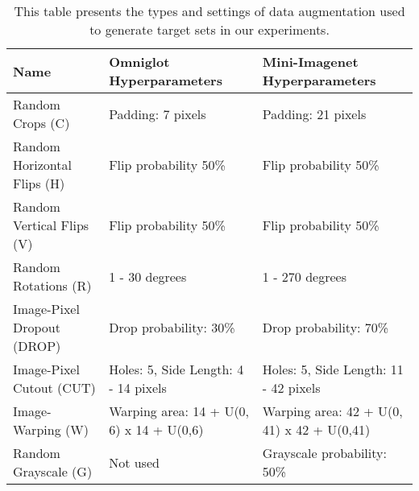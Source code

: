 \documentclass{article}
\begin{document}
\begin{table*}[!htp]
\begin{tabular}{lll}
\hline
\multicolumn{1}{|l|}{Name}                        & \multicolumn{1}{l|}{Omniglot Hyperparameters}                 & \multicolumn{1}{l|}{Mini-Imagenet Hyperparameters}                   \\ \hline
\multicolumn{1}{|l|}{Random Crops (C)}            & \multicolumn{1}{l|}{Padding: 7 pixels}                        & \multicolumn{1}{l|}{Padding: 21 pixels}                         \\ \hline
\multicolumn{1}{|l|}{Random Horizontal Flips (H)} & \multicolumn{1}{l|}{Flip probability 50\%}                     & \multicolumn{1}{l|}{Flip probability 50\%}                       \\ \hline
\multicolumn{1}{|l|}{Random Vertical Flips (V)}   & \multicolumn{1}{l|}{Flip probability 50\%}                     & \multicolumn{1}{l|}{Flip probability 50\%}                       \\ \hline
\multicolumn{1}{|l|}{Random Rotations (R)}        & \multicolumn{1}{l|}{1 - 30 degrees}                           & \multicolumn{1}{l|}{1 - 270 degrees}                            \\ \hline
\multicolumn{1}{|l|}{Image-Pixel Dropout (DROP)}  & \multicolumn{1}{l|}{Drop probability: 30\%}                    & \multicolumn{1}{l|}{Drop probability: 70\%}                      \\ \hline
\multicolumn{1}{|l|}{Image-Pixel Cutout (CUT)}    & \multicolumn{1}{l|}{Holes: 5, Side Length: 4 - 14 pixels}     & \multicolumn{1}{l|}{Holes: 5, Side Length: 11 - 42 pixels}      \\ \hline
\multicolumn{1}{|l|}{Image-Warping (W)}           & \multicolumn{1}{l|}{Warping area: 14 + U(0, 6) x 14 + U(0,6)} & \multicolumn{1}{l|}{Warping area: 42 + U(0, 41) x 42 + U(0,41)} \\ \hline
\multicolumn{1}{|l|}{Random Grayscale (G)}        & \multicolumn{1}{l|}{Not used}                                 & \multicolumn{1}{l|}{Grayscale probability: 50\%}                 \\ \hline
                                                                                                                 
\end{tabular}
\caption{This table presents the types and settings of data augmentation used to generate target sets in our experiments.}
\label{table:data-augmentations}
\end{table*}
\end{document}
